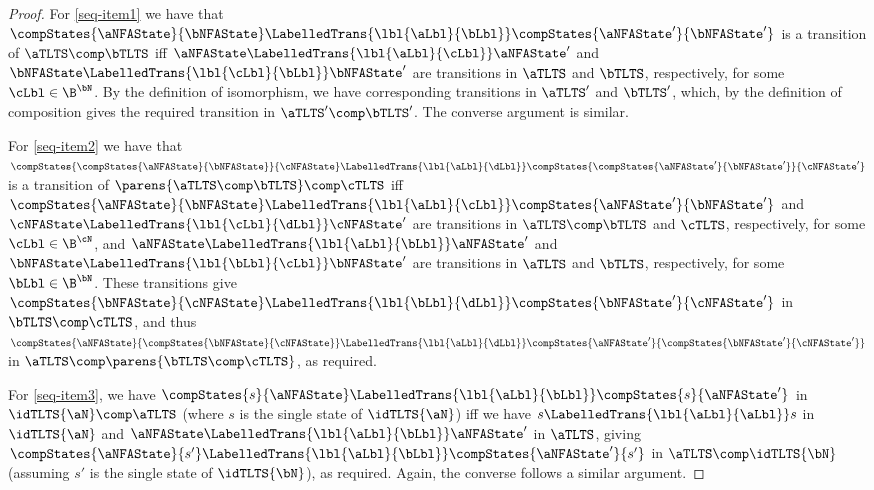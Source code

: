 \begin{proof}
    For \ref{seq-item1} we have that $\compStates{\aNFAState}{\bNFAState}
    \LabelledTrans{\lbl{\aLbl}{\bLbl}} \compStates{\aNFAState'}{\bNFAState'}$ is a transition of
    $\aTLTS \comp \bTLTS$ iff $\aNFAState \LabelledTrans{\lbl{\aLbl}{\cLbl}} \aNFAState'$ and
    $\bNFAState \LabelledTrans{\lbl{\cLbl}{\bLbl}} \bNFAState'$ are transitions in $\aTLTS$ and
    $\bTLTS$, respectively, for some $\cLbl \in \B^\bN$. By the definition of \TLTS{} isomorphism,
    we have corresponding transitions in $\aTLTS'$ and $\bTLTS'$, which, by the definition of
    \TLTS{} composition gives the required transition in $\aTLTS' \comp \bTLTS'$. The converse
    argument is similar.

    For \ref{seq-item2} we have that $\compStates{\compStates{\aNFAState}{\bNFAState}}{\cNFAState}
    \LabelledTrans{\lbl{\aLbl}{\dLbl}}
    \compStates{\compStates{\aNFAState'}{\bNFAState'}}{\cNFAState'}$ is a transition of
    $\parens{\aTLTS \comp \bTLTS} \comp \cTLTS$ iff $\compStates{\aNFAState}{\bNFAState}
    \LabelledTrans{\lbl{\aLbl}{\cLbl}} \compStates{\aNFAState'}{\bNFAState'}$ and $\cNFAState
    \LabelledTrans{\lbl{\cLbl}{\dLbl}} \cNFAState'$ are transitions in $\aTLTS \comp \bTLTS$ and
    $\cTLTS$, respectively, for some $\cLbl \in \B^\cN$, and $\aNFAState
    \LabelledTrans{\lbl{\aLbl}{\bLbl}} \aNFAState'$ and $\bNFAState
    \LabelledTrans{\lbl{\bLbl}{\cLbl}} \bNFAState'$ are transitions in $\aTLTS$ and $\bTLTS$,
    respectively, for some $\bLbl \in \B^\bN$.  These transitions give
    $\compStates{\bNFAState}{\cNFAState} \LabelledTrans{\lbl{\bLbl}{\dLbl}}
    \compStates{\bNFAState'}{\cNFAState'}$ in $\bTLTS \comp \cTLTS$, and thus
    $\compStates{\aNFAState}{\compStates{\bNFAState}{\cNFAState}}
    \LabelledTrans{\lbl{\aLbl}{\dLbl}}
    \compStates{\aNFAState'}{\compStates{\bNFAState'}{\cNFAState'}}$ in $\aTLTS \comp
    \parens{\bTLTS \comp \cTLTS}$, as required.

    For \ref{seq-item3}, we have $\compStates{s}{\aNFAState} \LabelledTrans{\lbl{\aLbl}{\bLbl}}
    \compStates{s}{\aNFAState'}$ in $\idTLTS{\aN} \comp \aTLTS$ (where $s$ is the single state of
    $\idTLTS{\aN}$) iff we have $s \LabelledTrans{\lbl{\aLbl}{\aLbl}} s$ in $\idTLTS{\aN}$ and
    $\aNFAState \LabelledTrans{\lbl{\aLbl}{\bLbl}} \aNFAState'$ in $\aTLTS$, giving
    $\compStates{\aNFAState}{s'} \LabelledTrans{\lbl{\aLbl}{\bLbl}} \compStates{\aNFAState'}{s'}$
    in $\aTLTS \comp \idTLTS{\bN}$ (assuming $s'$ is the single state of $\idTLTS{\bN}$), as
    required. Again, the converse follows a similar argument.
\end{proof}


